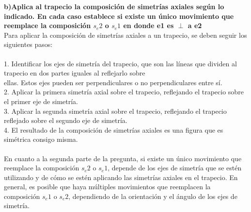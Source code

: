 \documentclass{article}
\begin{document}
{\bf b)Aplica al trapecio la composición de simetrías axiales según lo indicado. En cada caso establece si existe un único movimiento que reemplace la composición $s_e2$ o $s_e1$  en donde e1 es $\perp$ a e2 } \\
Para aplicar la composición de simetrías axiales a un trapecio, se deben seguir los siguientes pasos:\\
\\
1. Identificar los ejes de simetría del trapecio, que son las líneas que dividen al trapecio en dos partes iguales al reflejarlo sobre\\
ellas. Estos ejes pueden ser perpendiculares o no perpendiculares entre sí.\\
2. Aplicar la primera simetría axial sobre el trapecio, reflejando el trapecio sobre el primer eje de simetría.\\
3. Aplicar la segunda simetría axial sobre el trapecio, reflejando el trapecio reflejado sobre el segundo eje de simetría.\\
4. El resultado de la composición de simetrías axiales es una figura que es simétrica consigo misma.\\
\\
En cuanto a la segunda parte de la pregunta, si existe un único movimiento que reemplace la composición $s_e2$ o $s_e1$, depende de los ejes de simetría que se estén utilizando y de cómo se estén aplicando las simetrías axiales en el trapecio. En general, es posible que haya múltiples movimientos que reemplacen la composición $s_e1$ o $s_e2$, dependiendo de la orientación y el ángulo de los ejes de simetría.\\
\\
\end{document}
